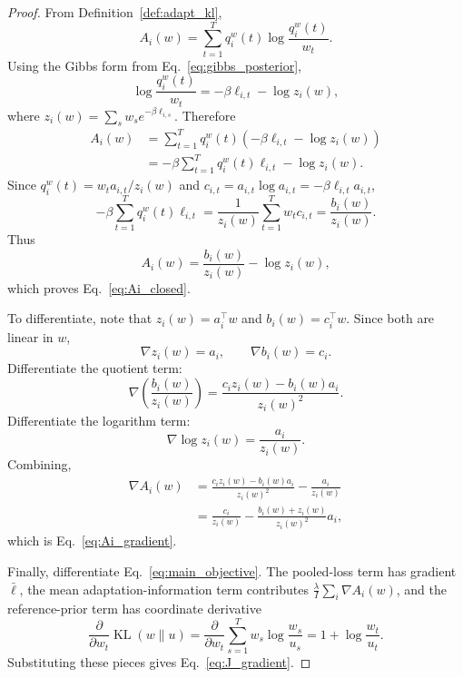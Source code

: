 \documentclass{article}
\newcommand{\KL}{\operatorname{KL}}
\begin{document}
\begin{proof}
From Definition~\ref{def:adapt_kl},
\begin{equation}
    A_i(w)
    =
    \sum_{t=1}^{T} q_i^w(t)\log \frac{q_i^w(t)}{w_t}.
\end{equation}
Using the Gibbs form from Eq.~\eqref{eq:gibbs_posterior},
\begin{equation}
    \log \frac{q_i^w(t)}{w_t}
    =
    -\beta \ell_{i,t} - \log z_i(w),
\end{equation}
where \(z_i(w)=\sum_s w_s e^{-\beta \ell_{i,s}}\). Therefore
\begin{align}
    A_i(w)
    &=
    \sum_{t=1}^{T} q_i^w(t)\left(-\beta \ell_{i,t} - \log z_i(w)\right) \\
    &=
    -\beta \sum_{t=1}^{T} q_i^w(t)\ell_{i,t} - \log z_i(w).
\end{align}
Since \(q_i^w(t)=w_t a_{i,t}/z_i(w)\) and \(c_{i,t}=a_{i,t}\log a_{i,t}=-\beta \ell_{i,t} a_{i,t}\),
\begin{equation}
    -\beta \sum_{t=1}^{T} q_i^w(t)\ell_{i,t}
    =
    \frac{1}{z_i(w)}\sum_{t=1}^{T} w_t c_{i,t}
    =
    \frac{b_i(w)}{z_i(w)}.
\end{equation}
Thus
\begin{equation}
    A_i(w)
    =
    \frac{b_i(w)}{z_i(w)} - \log z_i(w),
\end{equation}
which proves Eq.~\eqref{eq:Ai_closed}.

To differentiate, note that \(z_i(w)=a_i^\top w\) and \(b_i(w)=c_i^\top w\). Since both are linear in \(w\),
\begin{equation}
    \nabla z_i(w)=a_i,
    \qquad
    \nabla b_i(w)=c_i.
\end{equation}
Differentiate the quotient term:
\begin{equation}
    \nabla \left(\frac{b_i(w)}{z_i(w)}\right)
    =
    \frac{c_i z_i(w)-b_i(w)a_i}{z_i(w)^2}.
\end{equation}
Differentiate the logarithm term:
\begin{equation}
    \nabla \log z_i(w)=\frac{a_i}{z_i(w)}.
\end{equation}
Combining,
\begin{align}
    \nabla A_i(w)
    &=
    \frac{c_i z_i(w)-b_i(w)a_i}{z_i(w)^2}
    -
    \frac{a_i}{z_i(w)} \\
    &=
    \frac{c_i}{z_i(w)}
    -
    \frac{b_i(w)+z_i(w)}{z_i(w)^2} a_i,
\end{align}
which is Eq.~\eqref{eq:Ai_gradient}.

Finally, differentiate Eq.~\eqref{eq:main_objective}. The pooled-loss term has gradient \(\bar \ell\), the mean adaptation-information term contributes \(\frac{\lambda}{I}\sum_i \nabla A_i(w)\), and the reference-prior term has coordinate derivative
\begin{equation}
    \frac{\partial}{\partial w_t}\KL(w\|u)
    =
    \frac{\partial}{\partial w_t}\sum_{s=1}^{T} w_s \log\frac{w_s}{u_s}
    =
    1+\log\frac{w_t}{u_t}.
\end{equation}
Substituting these pieces gives Eq.~\eqref{eq:J_gradient}. \qedhere
\end{proof}
\end{document}
